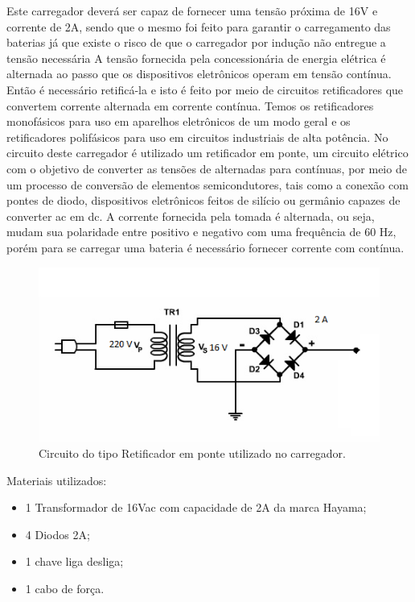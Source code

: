 Este carregador deverá ser capaz de fornecer uma tensão próxima de 16V e corrente de 2A, sendo que o mesmo foi feito para garantir o carregamento das baterias já que existe o risco de que o carregador por indução não entregue a tensão necessária
A tensão fornecida pela concessionária de energia elétrica é alternada ao passo que os dispositivos eletrônicos operam em tensão contínua. Então é necessário retificá-la e isto é feito por meio de circuitos retificadores que convertem corrente alternada em corrente contínua. Temos os retificadores monofásicos para uso em aparelhos eletrônicos de um modo geral e os retificadores polifásicos para uso em circuitos industriais de alta potência. 
No circuito deste carregador é utilizado um retificador em ponte, um circuito elétrico com o objetivo de converter as tensões de alternadas para contínuas, por meio de um processo de conversão de elementos semicondutores, tais como a conexão com pontes de diodo, dispositivos eletrônicos feitos de silício ou germânio capazes de converter ac em dc. A corrente fornecida pela tomada é alternada, ou seja, mudam sua polaridade entre positivo e negativo com uma frequência de 60 Hz, porém para se carregar uma bateria é necessário fornecer corrente com contínua.

 \begin{figure}[H]
	\centering
	\includegraphics[scale=0.5]{figuras/circuitoretificadorcarregador}
	\caption{Circuito do tipo Retificador em ponte utilizado no carregador.}
	\label{img:circuitoretificadorcarregador}
\end{figure}

Materiais utilizados:
\begin{itemize}
\item 1 Transformador de 16Vac com capacidade de 2A da marca Hayama;
\item 4 Diodos 2A;
\item 1 chave liga desliga;
\item 1 cabo de força.
\end{itemize}

